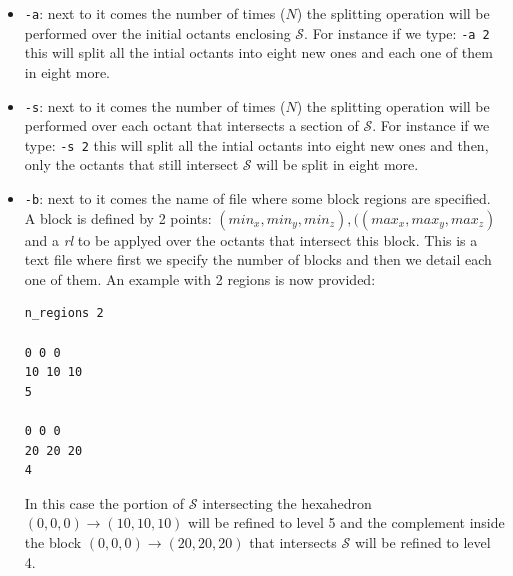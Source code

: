 \documentclass[10pt]{article}
\begin{document}
\begin{itemize}
\item \texttt{-a}: next to it comes the number of times ($N$) the splitting operation will be performed over the initial octants enclosing $\mathcal{S}$. For instance if we type: \texttt{-a 2} this will split all the intial octants into eight new ones and each one of them in eight more.
\item \texttt{-s}: next to it comes the number of times ($N$) the splitting operation will be performed over each octant that intersects a section of $\mathcal{S}$. For instance if we type: \texttt{-s 2} this will split all the intial octants into eight new ones and  then, only the octants that still intersect $\mathcal{S}$ will be split in eight more.
\item \texttt{-b}: next to it comes the name of file where some block regions are specified. A block is defined by 2 points: $(min_x, min_y, min_z), ((max_x, max_y, max_z)$ and a \textit{rl} to be applyed over the octants that intersect this block. This is a text file where first we specify the number of blocks and then we detail each one of them. An example with 2 regions is now provided:

\begin{minipage}{0.2\textwidth}
\begin{verbatim}
n_regions 2

0 0 0
10 10 10
5

0 0 0
20 20 20
4
\end{verbatim}
\end{minipage}
\hfill
\begin{minipage}[c]{0.65\textwidth}
In this case the portion of $\mathcal{S}$ intersecting the hexahedron $(0,0,0) \to (10,10,10)$ will be refined to level 5 and the complement inside the block $(0,0,0) \to (20,20,20)$ that intersects $\mathcal{S}$ will be refined to level 4.\\[0.2cm]


\end{minipage}
\end{itemize}
\end{document}
